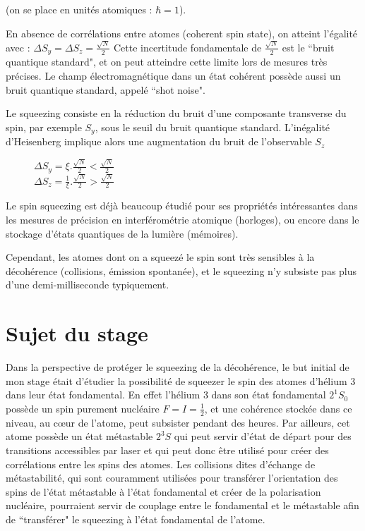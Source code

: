 \documentclass[a4paper,10pt]{article}
\begin{document}
\noindent
(on se place en unit\'{e}s atomiques : $\hbar=1$).

En absence de corr\'elations entre atomes (coherent spin state), on atteint
l'\'egalit\'e avec : $\Delta S_y = \Delta S_z = \frac{\sqrt{N}}{2}$
Cette incertitude fondamentale de $\frac{\sqrt{N}}{2}$ est le ``bruit quantique
standard", et on peut atteindre cette limite lors de mesures tr\`{e}s pr\'{e}cises. Le
champ \'{e}lectromagn\'{e}tique dans un \'{e}tat coh\'{e}rent poss\`{e}de aussi un bruit quantique
standard, appel\'{e} ``shot noise".

Le squeezing consiste en la r\'{e}duction du bruit d'une composante transverse
du spin, par exemple $S_y$, sous le
seuil du bruit quantique standard. L'in\'{e}galit\'{e} d'Heisenberg implique alors une
augmentation du bruit de l'observable $S_z$ \
\begin{figure}[h!]
\begin{center}
$\Delta S_y = \xi . \frac{\sqrt{N}}{2} < \frac{\sqrt{N}}{2} $\\

$\Delta S_z = \frac{1}{\xi} . \frac{\sqrt{N}}{2} > \frac{\sqrt{N}}{2} $
\end{center}
\end{figure}
Le spin squeezing est d\'{e}j\`{a} beaucoup \'{e}tudi\'{e} pour ses propri\'{e}t\'{e}s int\'{e}ressantes
dans les mesures de pr\'{e}cision en interf\'{e}rom\'{e}trie atomique (horloges), ou encore
dans le stockage d'\'{e}tats quantiques de la lumi\`{e}re (m\'{e}moires).

Cependant, les atomes dont on a squeez\'{e} le spin sont tr\`{e}s
sensibles \`{a} la d\'{e}coh\'{e}rence (collisions, \'{e}mission spontan\'{e}e), et le squeezing
n'y subsiste pas plus d'une demi-milliseconde typiquement. \

\section{Sujet du stage}
Dans la perspective de prot\'{e}ger le squeezing de la d\'{e}coh\'{e}rence, le but initial
de mon stage \'{e}tait d'\'{e}tudier la possibilit\'{e} de squeezer le spin des atomes
d'h\'{e}lium 3 dans leur \'etat fondamental. En effet l'h\'{e}lium 3 dans son \'{e}tat fondamental $2^1S_0$
poss\`{e}de un spin purement nucl\'{e}aire $F = I = \frac{1}{2}$, et une coh\'{e}rence
stock\'{e}e dans ce niveau, au c\oe ur de l'atome, peut subsister pendant des heures.
Par ailleurs, cet atome poss\`{e}de un \'{e}tat m\'{e}tastable $2^3S$ qui peut servir
d'\'{e}tat de d\'{e}part pour des transitions accessibles par laser et qui peut donc
\^{e}tre utilis\'{e} pour cr\'{e}er des corr\'{e}lations entre les spins des
atomes. Les collisions dites d'\'{e}change de m\'{e}tastabilit\'{e}, qui sont couramment
utilis\'{e}es pour transf\'{e}rer l'orientation des spins de l'\'{e}tat m\'{e}tastable \`{a} l'\'{e}tat
fondamental et cr\'{e}er de la polarisation nucl\'{e}aire, pourraient servir de
couplage entre le fondamental et le m\'{e}tastable afin de ``transf\'{e}rer" le
squeezing \`a l'\'etat fondamental de l'atome.
\end{document}
